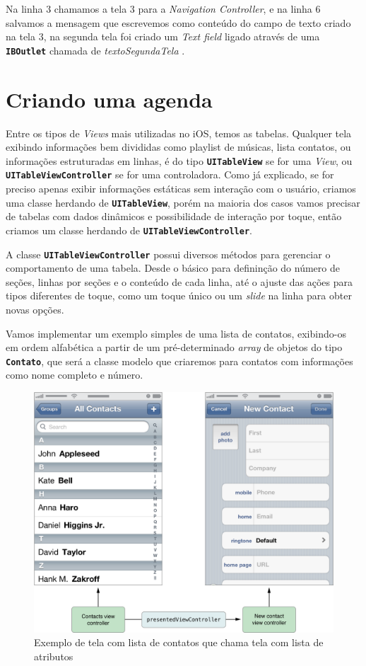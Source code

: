 \documentclass[a4paper,12pt,brazil,doubleside]{book}
\begin{document}
\begin{singlespace}
Na linha 3 chamamos a tela 3 para a \emph{Navigation Controller}, e na linha 6 salvamos a mensagem que escrevemos como conteúdo do campo de texto criado na tela 3, na segunda tela foi criado um \emph{Text field} ligado através de uma \texttt{\textbf{IBOutlet}} chamada de \emph{textoSegundaTela} .

\bigskip
\bigskip


\section{Criando uma agenda}


Entre os tipos de \emph{Views} mais utilizadas no iOS, temos as tabelas. Qualquer tela exibindo informações bem divididas como playlist de músicas, lista contatos, ou informações estruturadas em linhas, é do tipo \texttt{\textbf{UITableView}} se for uma \emph{View}, ou \texttt{\textbf{UITableViewController}} se for uma controladora. Como já explicado, se for preciso apenas exibir informações estáticas sem interação com o usuário, criamos uma classe herdando de \texttt{\textbf{UITableView}}, porém na maioria dos casos vamos precisar de tabelas com dados dinâmicos e possibilidade de interação por toque, então criamos um classe herdando de \texttt{\textbf{UITableViewController}}.

A classe \texttt{\textbf{UITableViewController}} possui diversos métodos para gerenciar o comportamento de uma tabela. Desde o básico para defininção do número de seções, linhas por seções e o conteúdo de cada linha, até o ajuste das ações para tipos diferentes de toque, como um toque único ou um \emph{slide} na linha para obter novas opções.

Vamos implementar um exemplo simples de uma lista de contatos, exibindo-os em ordem alfabética a partir de um pré-determinado \emph{array} de objetos do tipo \texttt{\textbf{Contato}}, que será a classe modelo que criaremos para contatos com informações como nome completo e número.

\bigskip
\bigskip

\begin{figure}[H]
  \centering
  \includegraphics[width=.75\textwidth]{figuras/apple_table_view_controller_contatos.png}
  \caption{Exemplo de tela com lista de contatos que chama tela com lista de atributos}
  \label{fig:a}
\end{figure}


\end{singlespace}
\end{document}
